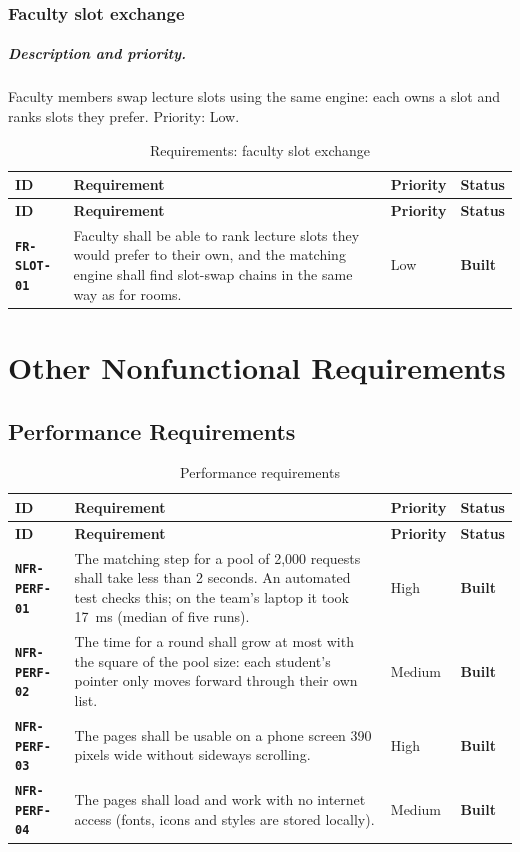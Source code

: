 \documentclass[11pt,a4paper,parskip=half,toc=listof]{scrreprt}
\newcommand{\Built}{\textcolor{builtgreen}{\textbf{Built}}}
\newcommand{\Req}[1]{\textbf{\texttt{#1}}}
\newcommand{\ReqHeader}{%
  \toprule
  \textbf{ID} & \textbf{Requirement} & \textbf{Priority} & \textbf{Status}\\
  \midrule}
\begin{document}
\subsection{Faculty slot exchange}

\paragraph{Description and priority.} Faculty members swap lecture slots
using the same engine: each owns a slot and ranks slots they prefer.
Priority: Low.

\begin{xltabular}{\linewidth}{@{}L{2.25cm}YL{1.55cm}L{1.6cm}@{}}
  \caption{Requirements: faculty slot exchange}\label{tab:fr-slot}\\
  \ReqHeader
  \endfirsthead
  \ReqHeader
  \endhead
  \bottomrule
  \endlastfoot
  \Req{FR-SLOT-01} & Faculty shall be able to rank lecture slots they would
    prefer to their own, and the matching engine shall find slot-swap
    chains in the same way as for rooms. & Low & \Built\\
\end{xltabular}

\chapter{Other Nonfunctional Requirements}

\section{Performance Requirements}

\begin{xltabular}{\linewidth}{@{}L{2.25cm}YL{1.55cm}L{1.6cm}@{}}
  \caption{Performance requirements}\label{tab:nfr-perf}\\
  \ReqHeader
  \endfirsthead
  \ReqHeader
  \endhead
  \bottomrule
  \endlastfoot
  \Req{NFR-PERF-01} & The matching step for a pool of 2{,}000 requests shall
    take less than 2 seconds. An automated test checks this; on the team's
    laptop it took 17~ms (median of five runs). & High & \Built\\
  \Req{NFR-PERF-02} & The time for a round shall grow at most with the
    square of the pool size: each student's pointer only moves forward
    through their own list. & Medium & \Built\\
  \Req{NFR-PERF-03} & The pages shall be usable on a phone screen 390 pixels
    wide without sideways scrolling. & High & \Built\\
  \Req{NFR-PERF-04} & The pages shall load and work with no internet
    access (fonts, icons and styles are stored locally). & Medium &
    \Built\\
\end{xltabular}
\end{document}
